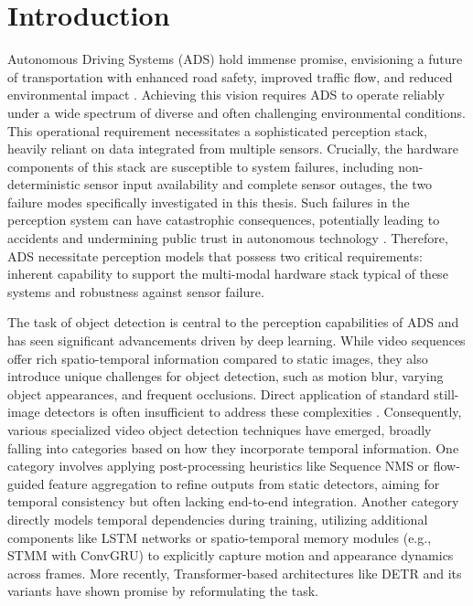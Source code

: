 \section{Introduction} \label{Introduction}


Autonomous Driving Systems (ADS) hold immense promise, envisioning a future of transportation with enhanced road safety, improved traffic flow, and reduced environmental impact \cite{litmanAutonomousVehicleImplementationb}. Achieving this vision requires ADS to operate reliably under a wide spectrum of diverse and often challenging environmental conditions. This operational requirement necessitates a sophisticated perception stack, heavily reliant on data integrated from multiple sensors. Crucially, the hardware components of this stack are susceptible to system failures, including non-deterministic sensor input availability and complete sensor outages, the two failure modes specifically investigated in this thesis. Such failures in the perception system can have catastrophic consequences, potentially leading to accidents and undermining public trust in autonomous technology \cite{}. Therefore, ADS necessitate perception models that possess two critical requirements: inherent capability to support the multi-modal hardware stack typical of these systems and robustness against sensor failure.

The task of object detection is central to the perception capabilities of ADS and has seen significant advancements driven by deep learning. While video sequences offer rich spatio-temporal information compared to static images, they also introduce unique challenges for object detection, such as motion blur, varying object appearances, and frequent occlusions. Direct application of standard still-image detectors is often insufficient to address these complexities \cite{redmonYouOnlyLook2016}. Consequently, various specialized video object detection techniques have emerged, broadly falling into categories based on how they incorporate temporal information. One category involves applying post-processing heuristics like Sequence NMS \cite{hanSeqNMSVideoObject2016} or flow-guided feature aggregation \cite{kangTCNNTubeletsConvolutional2018, kangObjectDetectionVideo2016} to refine outputs from static detectors, aiming for temporal consistency but often lacking end-to-end integration. Another category directly models temporal dependencies during training, utilizing additional components like LSTM networks \cite{Lu_2017_ICCV} or spatio-temporal memory modules (e.g., STMM with ConvGRU) \cite{xiaoVideoObjectDetection2018} to explicitly capture motion and appearance dynamics across frames. More recently, Transformer-based architectures like DETR and its variants \cite{carionEndtoEndObjectDetection2020,} have shown promise by reformulating the task.

